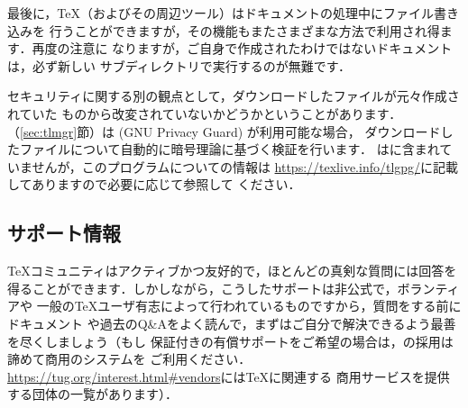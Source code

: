 \documentclass[uplatex,dvipdfmx,tombow]{jsarticle}
\begin{document}
最後に，\TeX （およびその周辺ツール）はドキュメントの処理中にファイル書き込みを
行うことができますが，その機能もまたさまざまな方法で利用され得ます．再度の注意に
なりますが，ご自身で作成されたわけではないドキュメントは，必ず新しい
サブディレクトリで実行するのが無難です．

セキュリティに関する別の観点として，ダウンロードしたファイルが元々作成されていた
ものから改変されていないかどうかということがあります．%
（\ref{sec:tlmgr}節）は (GNU Privacy Guard) が利用可能な場合，
ダウンロードしたファイルについて自動的に暗号理論に基づく検証を行います．
は\TL に含まれていませんが，このプログラムについての情報は
\url{https://texlive.info/tlgpg/}に記載してありますので必要に応じて参照して
ください．

\subsection{サポート情報}
\label{sec:help}

\TeX コミュニティはアクティブかつ友好的で，ほとんどの真剣な質問には回答を
得ることができます．しかしながら，こうしたサポートは非公式で，ボランティアや
一般の\TeX ユーザ有志によって行われているものですから，質問をする前にドキュメント
や過去のQ\&Aをよく読んで，まずはご自分で解決できるよう最善を尽くしましょう（もし
保証付きの有償サポートをご希望の場合は，\TL の採用は諦めて商用のシステムを
ご利用ください．\url{https://tug.org/interest.html#vendors}には\TeX に関連する
商用サービスを提供する団体の一覧があります）．
\end{document}
